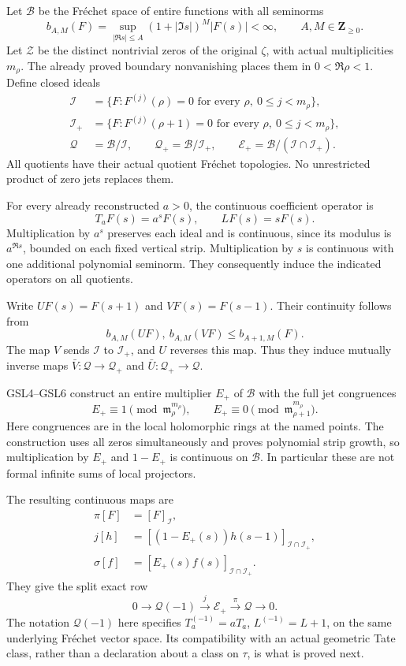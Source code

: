Let \(\mathcal B\) be the Fréchet space of entire functions with all
seminorms \[
b_{A,M}(F)=\sup_{|\Re s|\le A}(1+|\Im s|)^M|F(s)|<\infty,
\qquad A,M\in\mathbf Z_{\ge0}.
\tag{GTZ1.1}
\] Let \(\mathscr Z\) be the distinct nontrivial zeros of the original
\(\zeta\), with actual multiplicities \(m_\rho\). The already proved
boundary nonvanishing places them in \(0<\Re\rho<1\). Define closed
ideals \[
\begin{aligned}
\mathcal I&=\{F:F^{(j)}(\rho)=0\text{ for every }\rho,\ 0\le j<m_\rho\},\\
\mathcal I_+&=\{F:F^{(j)}(\rho+1)=0\text{ for every }\rho,\ 0\le j<m_\rho\},\\
\mathcal Q&=\mathcal B/\mathcal I,\qquad
\mathcal Q_+=\mathcal B/\mathcal I_+,\qquad
\mathcal E_+=\mathcal B/(\mathcal I\cap\mathcal I_+).
\end{aligned}
\tag{GTZ1.2}
\] All quotients have their actual quotient Fréchet topologies. No
unrestricted product of zero jets replaces them.

For every already reconstructed \(a>0\), the continuous coefficient
operator is \[
T_aF(s)=a^sF(s),\qquad L F(s)=sF(s).
\tag{GTZ1.3}
\] Multiplication by \(a^s\) preserves each ideal and is continuous,
since its modulus is \(a^{\Re s}\), bounded on each fixed vertical
strip. Multiplication by \(s\) is continuous with one additional
polynomial seminorm. They consequently induce the indicated operators on
all quotients.

Write \(U F(s)=F(s+1)\) and \(V F(s)=F(s-1)\). Their continuity follows
from \[
b_{A,M}(U F),\ b_{A,M}(V F)\le b_{A+1,M}(F).
\tag{GTZ1.4}
\] The map \(V\) sends \(\mathcal I\) to \(\mathcal I_+\), and \(U\)
reverses this map. Thus they induce mutually inverse maps
\(\bar V:\mathcal Q\to\mathcal Q_+\) and
\(\bar U:\mathcal Q_+\to\mathcal Q\).

GSL4--GSL6 construct an entire multiplier \(E_+\) of \(\mathcal B\) with
the full jet congruences \[
E_+\equiv1\pmod{\mathfrak m_\rho^{m_\rho}},
\qquad
E_+\equiv0\pmod{\mathfrak m_{\rho+1}^{m_\rho}}.
\tag{GTZ1.5}
\] Here congruences are in the local holomorphic rings at the named
points. The construction uses all zeros simultaneously and proves
polynomial strip growth, so multiplication by \(E_+\) and \(1-E_+\) is
continuous on \(\mathcal B\). In particular these are not formal
infinite sums of local projectors.

The resulting continuous maps are \[
\begin{aligned}
\pi[F]&=[F]_{\mathcal I},\\
j[h]&=[(1-E_+(s))h(s-1)]_{\mathcal I\cap\mathcal I_+},\\
\sigma[f]&=[E_+(s)f(s)]_{\mathcal I\cap\mathcal I_+}.
\end{aligned}
\tag{GTZ1.6}
\] They give the split exact row \[
0\longrightarrow\mathcal Q(-1)\xrightarrow{j}
\mathcal E_+\xrightarrow{\pi}\mathcal Q\longrightarrow0.
\tag{GTZ1.7}
\] The notation \(\mathcal Q(-1)\) here specifies \(T_a^{(-1)}=aT_a\),
\(L^{(-1)}=L+1\), on the same underlying Fréchet vector space. Its
compatibility with an actual geometric Tate class, rather than a
declaration about a class on \(\tau\), is what is proved next.

